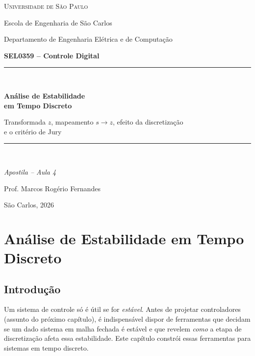 \documentclass[11pt,a4paper,oneside]{book}
\theoremstyle{definition}
\theoremstyle{plain}
\begin{document}

\frontmatter

\begin{titlepage}
\centering
\vspace*{1.5cm}
{\Large\scshape Universidade de São Paulo\par}
{\large Escola de Engenharia de São Carlos\par}
{\large Departamento de Engenharia Elétrica e de Computação\par}
\vspace{1.2cm}
{\large\bfseries SEL0359 -- Controle Digital\par}
\vspace{2.2cm}
\rule{\linewidth}{0.5pt}\\[0.5cm]
{\Huge\bfseries Análise de Estabilidade\\[0.2cm] em Tempo Discreto\par}
\vspace{0.5cm}
{\large Transformada $z$, mapeamento $s\to z$, efeito da discretização\\
e o critério de Jury\par}
\rule{\linewidth}{0.5pt}\\[0.5cm]
\vspace{1.0cm}
{\large\itshape Apostila -- Aula 4\par}
\vfill
{\large Prof. Marcos Rogério Fernandes\par}
\vspace{0.5cm}
{\normalsize São Carlos, 2026\par}
\end{titlepage}

\tableofcontents
\cleardoublepage

\mainmatter

\chapter{Análise de Estabilidade em Tempo Discreto}
\label{cap:estabilidade}

\section{Introdução}

Um sistema de controle só é útil se for \emph{estável}. Antes de projetar
controladores (assunto do próximo capítulo), é indispensável dispor de
ferramentas que decidam se um dado sistema em malha fechada é estável e que
revelem \emph{como} a etapa de discretização afeta essa estabilidade. Este
capítulo constrói essas ferramentas para sistemas em tempo discreto.
\end{document}
